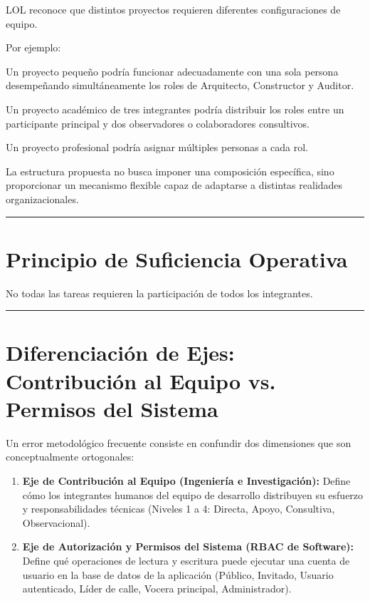 \documentclass[14pt,a4paper,oneside]{extbook}
\begin{document}
LOL reconoce que distintos proyectos requieren diferentes configuraciones de equipo.

Por ejemplo:

Un proyecto pequeño podría funcionar adecuadamente con una sola persona desempeñando simultáneamente los roles de Arquitecto, Constructor y Auditor.

Un proyecto académico de tres integrantes podría distribuir los roles entre un participante principal y dos observadores o colaboradores consultivos.

Un proyecto profesional podría asignar múltiples personas a cada rol.

La estructura propuesta no busca imponer una composición específica, sino proporcionar un mecanismo flexible capaz de adaptarse a distintas realidades organizacionales.

\par\vspace{1.5em}\noindent\hfill\rule{0.25\textwidth}{0.6pt}\hfill\par\vspace{1.5em}

\section{Principio de Suficiencia Operativa}

No todas las tareas requieren la participación de todos los integrantes.

\par\vspace{1.5em}\noindent\hfill\rule{0.25\textwidth}{0.6pt}\hfill\par\vspace{1.5em}

\section{Diferenciación de Ejes: Contribución al Equipo vs. Permisos del Sistema}

Un error metodológico frecuente consiste en confundir dos dimensiones que son conceptualmente ortogonales:
\begin{enumerate}
\item \textbf{Eje de Contribución al Equipo (Ingeniería e Investigación):} Define cómo los integrantes humanos del equipo de desarrollo distribuyen su esfuerzo y responsabilidades técnicas (Niveles 1 a 4: Directa, Apoyo, Consultiva, Observacional).
\item \textbf{Eje de Autorización y Permisos del Sistema (RBAC de Software):} Define qué operaciones de lectura y escritura puede ejecutar una cuenta de usuario en la base de datos de la aplicación (Público, Invitado, Usuario autenticado, Líder de calle, Vocera principal, Administrador).
\end{enumerate}
\end{document}
